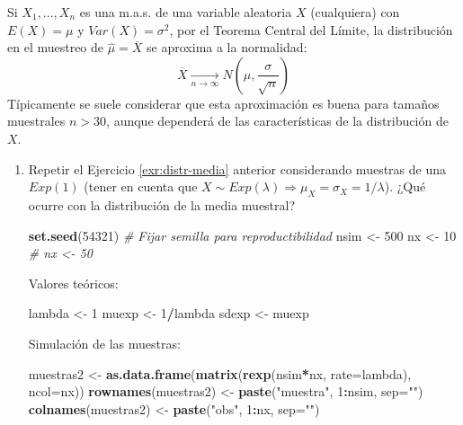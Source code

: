 \documentclass[
]{book}
\newenvironment{Shaded}{\begin{snugshade}}{\end{snugshade}}
\newcommand{\CommentTok}[1]{\textcolor[rgb]{0.56,0.35,0.01}{\textit{#1}}}
\newcommand{\DataTypeTok}[1]{\textcolor[rgb]{0.13,0.29,0.53}{#1}}
\newcommand{\DecValTok}[1]{\textcolor[rgb]{0.00,0.00,0.81}{#1}}
\newcommand{\KeywordTok}[1]{\textcolor[rgb]{0.13,0.29,0.53}{\textbf{#1}}}
\newcommand{\NormalTok}[1]{#1}
\newcommand{\OperatorTok}[1]{\textcolor[rgb]{0.81,0.36,0.00}{\textbf{#1}}}
\newcommand{\StringTok}[1]{\textcolor[rgb]{0.31,0.60,0.02}{#1}}
\theoremstyle{break}
\theoremstyle{definition}
\theoremstyle{definition}
\theoremstyle{definition}
\theoremstyle{remark}
\begin{document}
Si \(X_{1},\ldots,X_{n}\) es una m.a.s. de una variable aleatoria
\(X\) (cualquiera) con \(E\left( X \right) = \mu\) y
\(Var\left( X \right) = \sigma^{2}\), por el Teorema Central del Límite,
la distribución en el muestreo de \(\hat{\mu}=\overline{X}\) se aproxima a la
normalidad:
\[\overline{X}\underset{n\rightarrow\infty}{\longrightarrow}
N\left( \mu, \dfrac{\sigma}{\sqrt{n}}\right)\]
Típicamente se suele considerar que esta aproximación es buena
para tamaños muestrales \(n>30\),
aunque dependerá de las características de la distribución de \(X\).

\begin{enumerate}
\def\labelenumi{\alph{enumi})}
\item
  Repetir el Ejercicio \ref{exr:distr-media} anterior considerando muestras de una \(Exp(1)\) (tener en cuenta que \(X\sim Exp(\lambda)\Rightarrow\mu_{X}=\sigma_{X}=1/\lambda\)).
  ¿Qué ocurre con la distribución de la media muestral?

\begin{Shaded}
\begin{Highlighting}[]
\KeywordTok{set.seed}\NormalTok{(}\DecValTok{54321}\NormalTok{) }\CommentTok{# Fijar semilla para reproductibilidad}
\NormalTok{nsim <-}\StringTok{ }\DecValTok{500}
\NormalTok{nx <-}\StringTok{ }\DecValTok{10}    
\CommentTok{# nx <- 50}
\end{Highlighting}
\end{Shaded}

  Valores teóricos:

\begin{Shaded}
\begin{Highlighting}[]
\NormalTok{lambda <-}\StringTok{ }\DecValTok{1}
\NormalTok{muexp <-}\StringTok{ }\DecValTok{1}\OperatorTok{/}\NormalTok{lambda}
\NormalTok{sdexp <-}\StringTok{ }\NormalTok{muexp}
\end{Highlighting}
\end{Shaded}

  Simulación de las muestras:

\begin{Shaded}
\begin{Highlighting}[]
\NormalTok{muestras2 <-}\StringTok{ }\KeywordTok{as.data.frame}\NormalTok{(}\KeywordTok{matrix}\NormalTok{(}\KeywordTok{rexp}\NormalTok{(nsim}\OperatorTok{*}\NormalTok{nx, }\DataTypeTok{rate=}\NormalTok{lambda), }\DataTypeTok{ncol=}\NormalTok{nx))}
\KeywordTok{rownames}\NormalTok{(muestras2) <-}\StringTok{ }\KeywordTok{paste}\NormalTok{(}\StringTok{"muestra"}\NormalTok{, }\DecValTok{1}\OperatorTok{:}\NormalTok{nsim, }\DataTypeTok{sep=}\StringTok{""}\NormalTok{)}
\KeywordTok{colnames}\NormalTok{(muestras2) <-}\StringTok{ }\KeywordTok{paste}\NormalTok{(}\StringTok{"obs"}\NormalTok{, }\DecValTok{1}\OperatorTok{:}\NormalTok{nx, }\DataTypeTok{sep=}\StringTok{""}\NormalTok{)}
\end{Highlighting}
\end{Shaded}


\end{enumerate}
\end{document}
